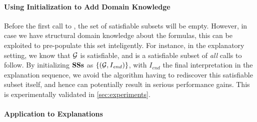 \paragraph{Using Initialization to Add Domain Knowledge}
Before the first call to \omusinc, the set \satsets of satisfiable subsets will be empty. 
However, in case we have structural domain knowledge about the formulas, this can be exploited to pre-populate this set inteligently. 
For instance, in the explanatory setting, we know that $\mathcal{G} $ is satisfiable, and is a satisfiable subset of \emph{all} \omusinc calls to follow. 
By initializing $\mathbf{SSs}$ as $\{(\mathcal{G} ,I_{\mathit{end}})\}$, with $I_\mathit{end}$ the final interpretation in the explanation sequence, we avoid the algorithm having to rediscover this satisfiable subset itself, and hence can potentially result in serious performance gains. This is experimentally validated in \cref{sec:experiments}.

\paragraph{Application to Explanations}

